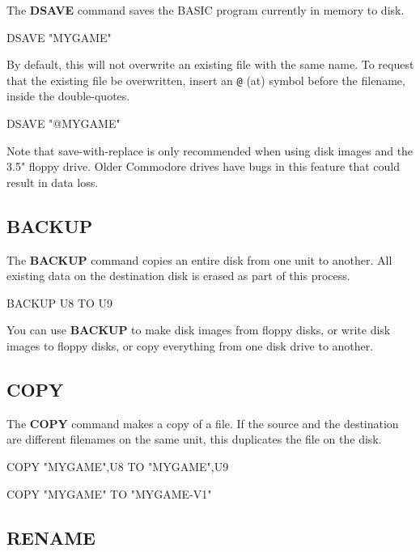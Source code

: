 The {\bf DSAVE} command saves the BASIC program currently in memory to disk.

\begin{screenoutput}
DSAVE "MYGAME"
\end{screenoutput}

By default, this will not overwrite an existing file with the same name. To request that the existing file be overwritten, insert an {\tt @} (at) symbol before the filename, inside the double-quotes.

\begin{screenoutput}
DSAVE "@MYGAME"
\end{screenoutput}

Note that save-with-replace is only recommended when using disk images and the 3.5" floppy drive. Older Commodore drives have bugs in this feature that could result in data loss.

\subsection{BACKUP}

The {\bf BACKUP} command copies an entire disk from one unit to another. All existing data on the destination disk is erased as part of this process.

\begin{screenoutput}
BACKUP U8 TO U9
\end{screenoutput}

You can use {\bf BACKUP} to make disk images from floppy disks, or write disk images to floppy disks, or copy everything from one disk drive to another.

\subsection{COPY}

The {\bf COPY} command makes a copy of a file. If the source and the destination are different filenames on the same unit, this duplicates the file on the disk.

\begin{screenoutput}
COPY "MYGAME",U8 TO "MYGAME",U9

COPY "MYGAME" TO "MYGAME-V1"
\end{screenoutput}

\subsection{RENAME}

